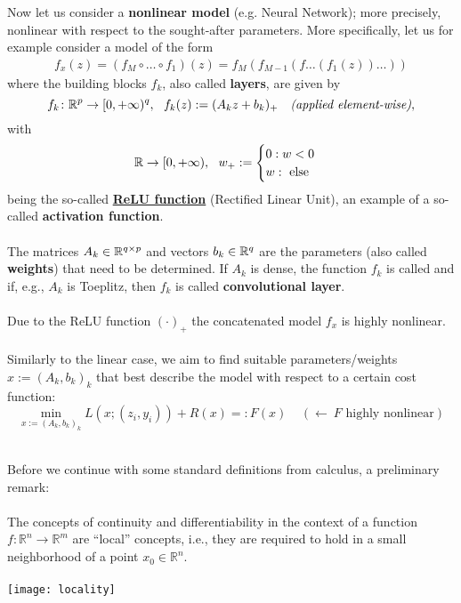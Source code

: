 \begin{frame}
Now let us consider a \textbf{nonlinear model} (e.g. Neural Network); more precisely, nonlinear with respect to the sought-after parameters. More specifically, let us for example consider a model of the form
\begin{align*}
f_x(z)=(f_M\circ\dots\circ f_1)(z)=f_M(f_{M-1}(f\dots(f_1(z))\dots))
\end{align*}
where the building blocks $f_k$, also called \textbf{layers}, are given by
$$f_k\colon {\mathbb{R}}^p \to  [0,+\infty)^q, ~~f_k(z):=(A_kz+b_k)_+~~~\textit{(applied element-wise)},$$ 
with
$${\mathbb{R}}\to [0,+\infty), ~~w_+:=\begin{cases} 
0:w<0\\w:~\text{else}
\end{cases}$$
being the so-called \textbf{\href{https://en.wikipedia.org/wiki/Rectifier_(neural_networks)}{ReLU function}} (Rectified Linear Unit), an example of a so-called \textbf{activation function}.\\~\\ 
The matrices $A_k \in {\mathbb{R}}^{q\times p}$ and vectors $b_k \in {\mathbb{R}}^{q}$ are the parameters (also called \textbf{weights}) that need to be determined. If $A_k$ is dense, the function $f_k$ is called  and if, e.g., $A_k$ is Toeplitz, then $f_k$ is called \textbf{convolutional layer}.~\\~\\
Due to the ReLU function $(\cdot)_+$ the concatenated model $f_x$ is highly nonlinear.\\
~\\
Similarly to the linear case, we aim to find suitable parameters/weights $x:=(A_k,b_k)_k$ that best describe the model with respect to a certain cost function:
$$
\min_{x:=(A_k,b_k)_k} L(x;(z_i,y_i))+R(x)=:F(x)~~~~~(\leftarrow~\text{$F$ highly nonlinear})
$$

\end{frame}

\begin{frame}
~\\
Before we continue with some standard definitions from calculus, a preliminary remark:
~\\~\\

The concepts of continuity and differentiability in the context of a function $f:\mathbb{R}^n\rightarrow\mathbb{R}^m$  are ``local'' concepts, i.e., they are required to hold in a small neighborhood of a point $x_0\in\mathbb{R}^n$.\\~\\
\texttt{[image: locality]}

\end{frame}

